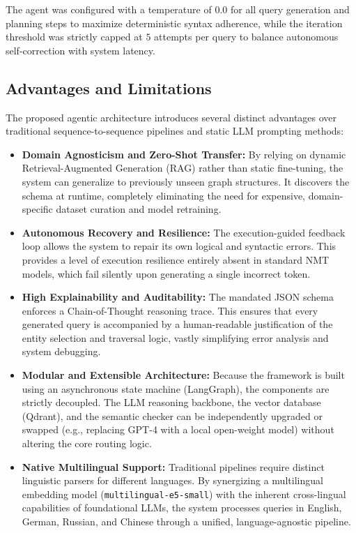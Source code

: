 The agent was configured with a temperature of $0.0$ for all query generation and planning steps to maximize deterministic syntax adherence, while the iteration threshold was strictly capped at $5$ attempts per query to balance autonomous self-correction with system latency.

\subsection{Advantages and Limitations}
\label{sec:methodology_limitations}

The proposed agentic architecture introduces several distinct advantages over traditional sequence-to-sequence pipelines and static LLM prompting methods:

\begin{itemize}
    \item \textbf{Domain Agnosticism and Zero-Shot Transfer:} By relying on dynamic Retrieval-Augmented Generation (RAG) rather than static fine-tuning, the system can generalize to previously unseen graph structures. It discovers the schema at runtime, completely eliminating the need for expensive, domain-specific dataset curation and model retraining.
    \item \textbf{Autonomous Recovery and Resilience:} The execution-guided feedback loop allows the system to repair its own logical and syntactic errors. This provides a level of execution resilience entirely absent in standard NMT models, which fail silently upon generating a single incorrect token.
    \item \textbf{High Explainability and Auditability:} The mandated JSON schema enforces a Chain-of-Thought reasoning trace. This ensures that every generated query is accompanied by a human-readable justification of the entity selection and traversal logic, vastly simplifying error analysis and system debugging.
    \item \textbf{Modular and Extensible Architecture:} Because the framework is built using an asynchronous state machine (LangGraph), the components are strictly decoupled. The LLM reasoning backbone, the vector database (Qdrant), and the semantic checker can be independently upgraded or swapped (e.g., replacing GPT-4 with a local open-weight model) without altering the core routing logic.
    \item \textbf{Native Multilingual Support:} Traditional pipelines require distinct linguistic parsers for different languages. By synergizing a multilingual embedding model (\texttt{multilingual-e5-small}) with the inherent cross-lingual capabilities of foundational LLMs, the system processes queries in English, German, Russian, and Chinese through a unified, language-agnostic pipeline.
\end{itemize}

